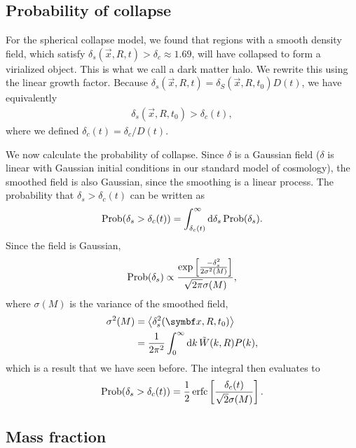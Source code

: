 \subsection{Probability of collapse}


For the spherical collapse model, we found that regions with a smooth density field, which satisfy $\delta_s(\vec{x}, R, t) > \delta_c \approx 1.69$,
will have collapsed to form a virialized object.
This is what we call a dark matter halo.
We rewrite this using the linear growth factor.
Because $\delta_s(\vec{x}, R, t) = \delta_S(\vec{x}, R, t_0) D(t)$, we have equivalently
\begin{align*}
	\delta_s(\vec{x}, R, t_0)
	> \delta_c(t),
\end{align*}
where we defined $\delta_c(t) = \delta_c / D(t)$.

We now calculate the probability of collapse.
Since $\delta$ is a Gaussian field
($\delta$ is linear with Gaussian initial conditions in our standard model of cosmology),
the smoothed field is also Gaussian, since the smoothing is a linear process.
The probability that $\delta_s > \delta_c(t)$ can be written as
\begin{align*}
	\operatorname{Prob}(\delta_s > \delta_c(t))
	= \int_{\delta_c(t)}^{\infty}
	\dd{\delta_s}
	\operatorname{Prob}(\delta_s).
\end{align*}
Since the field is Gaussian,
\begin{align*}
	\operatorname{Prob}(\delta_s)
	\propto
	\frac{
		\exp \left[
			\frac{-\delta_s^2}{2 \sigma^2(M)}
		\right]
	}{
		\sqrt{2\pi} \sigma(M)
	},
\end{align*}
where $\sigma(M)$ is the variance of the smoothed field,
\begin{align*}
	\sigma^2(M)
	&= \avg{\delta_s^2(\vec{x}, R, t_0)}\\
	&= \frac{1}{2\pi^2} \int_0^\infty \dd{k} \tilde{W}(k, R) P(k),
\end{align*}
which is a result that we have seen before.
The integral then evaluates to
\begin{align*}
	\operatorname{Prob}(\delta_s > \delta_c(t))
	= \frac{1}{2} \operatorname{erfc}
	\left[ \frac{\delta_c(t)}{\sqrt{2} \sigma(M)} \right].
\end{align*}

\subsection{Mass fraction}


